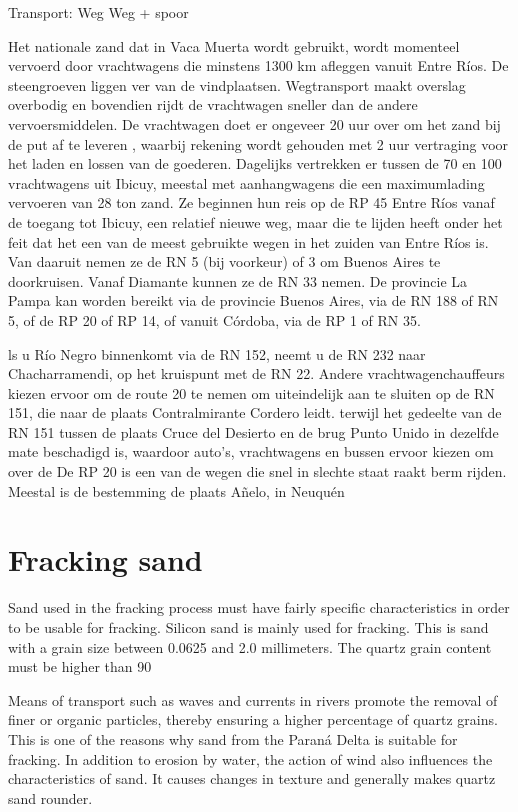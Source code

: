 Transport:
Weg
Weg + spoor

Het nationale zand dat in Vaca Muerta wordt gebruikt, wordt momenteel vervoerd door vrachtwagens die minstens 1300 km afleggen vanuit Entre Ríos. De steengroeven liggen ver van de vindplaatsen. Wegtransport maakt overslag overbodig en bovendien rijdt de vrachtwagen sneller dan de andere vervoersmiddelen. De vrachtwagen doet er ongeveer 20 uur over om het zand bij de put af te leveren , waarbij rekening wordt gehouden met 2 uur vertraging voor het laden en lossen van de goederen. Dagelijks vertrekken er tussen de 70 en 100 vrachtwagens uit Ibicuy, meestal met aanhangwagens die een maximumlading vervoeren van 28 ton zand. Ze beginnen hun reis op de RP 45 Entre Ríos vanaf de toegang tot Ibicuy, een relatief nieuwe weg, maar die te lijden heeft onder het feit dat het een van de meest gebruikte wegen in het zuiden van Entre Ríos is. Van daaruit nemen ze de RN 5 (bij voorkeur) of 3 om Buenos Aires te doorkruisen. Vanaf Diamante kunnen ze de RN 33 nemen. De provincie La Pampa kan worden bereikt via de provincie Buenos Aires, via de RN 188 of RN 5, of de RP 20 of RP 14, of vanuit Córdoba, via de RP 1 of RN 35.

ls u Río Negro binnenkomt via de RN 152, neemt u de RN 232 naar Chacharramendi, op het kruispunt met de RN 22. Andere vrachtwagenchauffeurs kiezen ervoor om de route 20 te nemen om uiteindelijk aan te sluiten op de RN 151, die naar de plaats Contralmirante Cordero leidt. terwijl het gedeelte van de RN 151 tussen de plaats Cruce del Desierto en de brug Punto Unido in dezelfde mate beschadigd is, waardoor auto's, vrachtwagens en bussen ervoor kiezen om over de De RP 20 is een van de wegen die snel in slechte staat raakt berm rijden. Meestal is de bestemming de plaats Añelo, in Neuquén




\section{Fracking sand}
Sand used in the fracking process must have fairly specific characteristics in order to be usable for fracking. Silicon sand is mainly used for fracking. This is sand with a grain size between 0.0625 and 2.0 millimeters. The quartz grain content must be higher than 90%

Means of transport such as waves and currents in rivers promote the removal of finer or organic particles, thereby ensuring a higher percentage of quartz grains. This is one of the reasons why sand from the Paraná Delta is suitable for fracking.
In addition to erosion by water, the action of wind also influences the characteristics of sand. It causes changes in texture and generally makes quartz sand rounder. 

